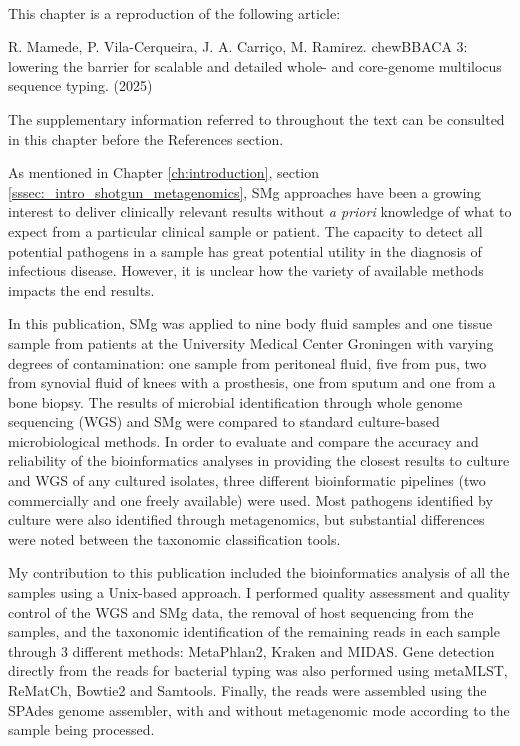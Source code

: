\mbox{}\\
\vspace{8cm}

This chapter is a reproduction of the following article:

R. Mamede, P. Vila-Cerqueira, J. A. Carriço, M. Ramirez. chewBBACA 3: lowering the barrier for scalable and detailed whole- and core-genome multilocus sequence typing. (2025)



The supplementary information referred to throughout the text can be consulted in this chapter before the References section. 

As mentioned in Chapter \ref{ch:introduction}, section \ref{sssec:_intro_shotgun_metagenomics}, SMg approaches have been a growing interest to deliver clinically relevant results without \textit{a priori} knowledge of what to expect from a particular clinical sample or patient. 
The capacity to detect all potential pathogens in a sample has great potential utility in the diagnosis of infectious disease. 
However, it is unclear how the variety of available methods impacts the end results.

In this publication, SMg was applied to nine body fluid samples and one tissue sample from patients at the University Medical Center Groningen with varying degrees of contamination: one sample from peritoneal fluid, five from pus, two from synovial fluid of knees with a prosthesis, one from sputum and one from a bone biopsy. The results of microbial identification through whole genome sequencing (\ac{WGS}) and SMg were compared to standard culture-based microbiological methods. 
In order to evaluate and compare the accuracy and reliability of the bioinformatics analyses in providing the closest results to culture and \ac{WGS} of any cultured isolates, three different bioinformatic pipelines (two commercially and one freely available) were used. Most pathogens identified by culture were also identified through metagenomics, but substantial differences were noted between the taxonomic classification tools. 

My contribution to this publication included the bioinformatics analysis of all the samples using a Unix-based approach. I performed quality assessment and quality control of the \ac{WGS} and SMg data, the removal of host sequencing from the samples, and the taxonomic identification of the remaining reads in each sample through 3 different methods: MetaPhlan2, Kraken and MIDAS. Gene detection directly from the reads for bacterial typing was also performed using metaMLST, ReMatCh, Bowtie2 and Samtools. Finally, the reads were assembled using the SPAdes genome assembler, with and without metagenomic mode according to the sample being processed. 

